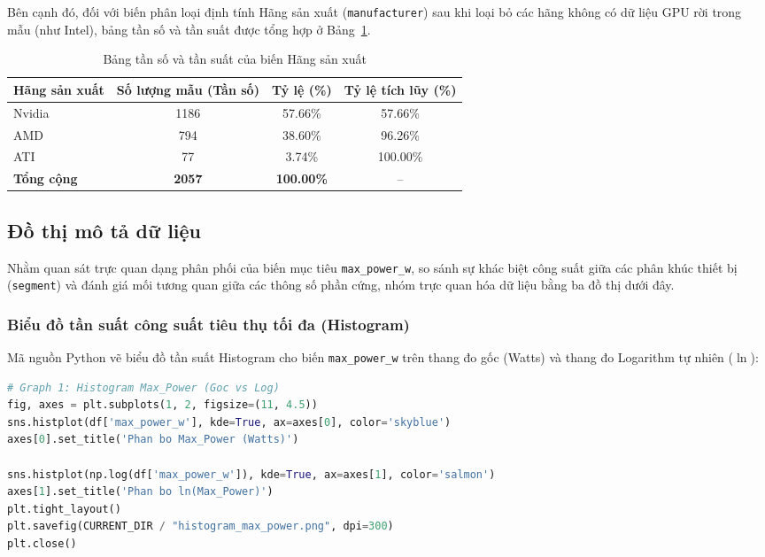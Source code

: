 \documentclass[12pt,a4paper]{article}
\begin{document}
Bên cạnh đó, đối với biến phân loại định tính Hãng sản xuất (\texttt{manufacturer}) sau khi loại bỏ các hãng không có dữ liệu GPU rời trong mẫu (như Intel), bảng tần số và tần suất được tổng hợp ở Bảng~\ref{tab:freq_manufacturer}.

\begin{table}[H]
    \centering
    \small
    \caption{Bảng tần số và tần suất của biến Hãng sản xuất}
    \label{tab:freq_manufacturer}
    \renewcommand{\arraystretch}{1.25}
    \begin{tabular}{|l|c|c|c|}
        \hline
        \rowcolor{TableHead}
        \textbf{Hãng sản xuất} & \textbf{Số lượng mẫu (Tần số)} & \textbf{Tỷ lệ (\%)} & \textbf{Tỷ lệ tích lũy (\%)} \\ \hline
        Nvidia & 1186 & 57.66\% & 57.66\% \\ \hline
        AMD & 794 & 38.60\% & 96.26\% \\ \hline
        ATI & 77 & 3.74\% & 100.00\% \\ \hline
        \textbf{Tổng cộng} & \textbf{2057} & \textbf{100.00\%} & -- \\ \hline
    \end{tabular}
\end{table}

\subsection{Đồ thị mô tả dữ liệu}

Nhằm quan sát trực quan dạng phân phối của biến mục tiêu \texttt{max\_power\_w}, so sánh sự khác biệt công suất giữa các phân khúc thiết bị (\texttt{segment}) và đánh giá mối tương quan giữa các thông số phần cứng, nhóm trực quan hóa dữ liệu bằng ba đồ thị dưới đây.

\subsubsection{Biểu đồ tần suất công suất tiêu thụ tối đa (Histogram)}

Mã nguồn Python vẽ biểu đồ tần suất Histogram cho biến \texttt{max\_power\_w} trên thang đo gốc (Watts) và thang đo Logarithm tự nhiên ($\ln$):

\begin{lstlisting}[language=Python]
# Graph 1: Histogram Max_Power (Goc vs Log)
fig, axes = plt.subplots(1, 2, figsize=(11, 4.5))
sns.histplot(df['max_power_w'], kde=True, ax=axes[0], color='skyblue')
axes[0].set_title('Phan bo Max_Power (Watts)')

sns.histplot(np.log(df['max_power_w']), kde=True, ax=axes[1], color='salmon')
axes[1].set_title('Phan bo ln(Max_Power)')
plt.tight_layout()
plt.savefig(CURRENT_DIR / "histogram_max_power.png", dpi=300)
plt.close()
\end{lstlisting}
\end{document}
